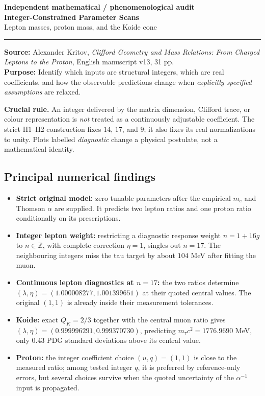 \documentclass[10.5pt,a4paper]{article}
\newcommand{\me}{m_e}
\begin{document}
\thispagestyle{fancy}
{\large\color{teal}\textbf{Independent mathematical / phenomenological audit}}\\[7pt]
{\LARGE\color{navy}\textbf{Integer-Constrained Parameter Scans}}\\[3pt]
{\Large\color{navy} Lepton masses, proton mass, and the Koide cone}\\[8pt]
\rule{\linewidth}{0.7pt}
\textbf{Source:} Alexander Kritov, \emph{Clifford Geometry and Mass Relations: From Charged Leptons to the Proton}, English manuscript v13, 31 pp.\\
\textbf{Purpose:} Identify which inputs are structural integers, which are real coefficients, and how the observable predictions change when \emph{explicitly specified assumptions} are relaxed.

\vspace{4pt}
\colorbox{blue!5}{\begin{minipage}{0.965\linewidth}
\textbf{Crucial rule.} An integer delivered by the matrix dimension, Clifford trace, or colour representation is \emph{not} treated as a continuously adjustable coefficient. The strict H1--H2 construction fixes \(14\), \(17\), and \(9\); it also fixes its real normalizations to unity. Plots labelled \emph{diagnostic} change a physical postulate, not a mathematical identity.
\end{minipage}}

\subsection*{Principal numerical findings}
\begin{itemize}\setlength{\itemsep}{4pt}
\item \textbf{Strict original model:} zero tunable parameters after the empirical \(\me\) and Thomson \(\alpha\) are supplied. It predicts two lepton ratios and one proton ratio conditionally on its prescriptions.
\item \textbf{Integer lepton weight:} restricting a diagnostic response weight \(n=1+16g\) to \(n\in\mathbb Z\), with complete correction \(\eta=1\), singles out \(n=17\). The neighbouring integers miss the tau target by about \(104\) MeV after fitting the muon.
\item \textbf{Continuous lepton diagnostics at \(n=17\):} the two ratios determine \((\lambda,\eta)=(1.000008277,1.001399651)\) at their quoted central values. The original \((1,1)\) is already inside their measurement tolerances.
\item \textbf{Koide:} exact \(Q_K=2/3\) together with the central muon ratio gives \((\lambda,\eta)=(0.999996291,0.999370730)\), predicting \(m_\tau c^2=1776.9690\) MeV, only \(0.43\) PDG standard deviations above its central value.
\item \textbf{Proton:} the integer coefficient choice \((u,q)=(1,1)\) is close to the measured ratio; among tested integer \(q\), it is preferred by reference-only errors, but several choices survive when the quoted uncertainty of the \(\alpha^{-1}\) input is propagated.
\end{itemize}
\end{document}
